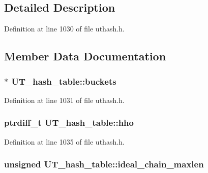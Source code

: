 \subsection{Detailed Description}


Definition at line 1030 of file uthash.\-h.



\subsection{Member Data Documentation}
\hypertarget{struct_u_t__hash__table_a8df0d350ea7376c8a844ae4c58509056}{
\subsubsection[{buckets}]{ $\ast$ U\-T\-\_\-hash\-\_\-table\-::buckets}}\label{struct_u_t__hash__table_a8df0d350ea7376c8a844ae4c58509056}


Definition at line 1031 of file uthash.\-h.

\hypertarget{struct_u_t__hash__table_afd05f4d9e45354fb010367ae9e1bddb6}{
\subsubsection[{hho}]{\setlength{\rightskip}{0pt plus 5cm}ptrdiff\-\_\-t U\-T\-\_\-hash\-\_\-table\-::hho}}\label{struct_u_t__hash__table_afd05f4d9e45354fb010367ae9e1bddb6}


Definition at line 1035 of file uthash.\-h.

\hypertarget{struct_u_t__hash__table_a5f1cec93d5d753ba02097c797e4d67ad}{
\subsubsection[{ideal\-\_\-chain\-\_\-maxlen}]{\setlength{\rightskip}{0pt plus 5cm}unsigned U\-T\-\_\-hash\-\_\-table\-::ideal\-\_\-chain\-\_\-maxlen}}\label{struct_u_t__hash__table_a5f1cec93d5d753ba02097c797e4d67ad}


